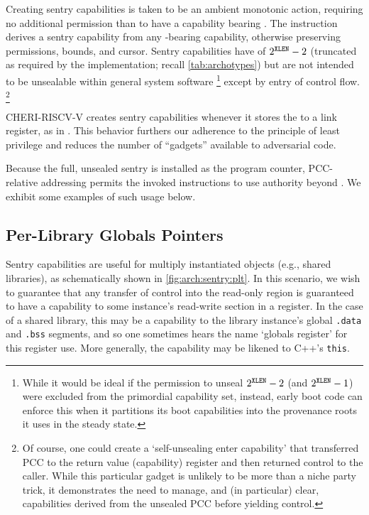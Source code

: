 Creating sentry capabilities is taken to be an ambient monotonic action,
requiring no additional permission than to have a capability bearing
\cappermX.
%
The  instruction derives a sentry capability from any
\cappermX-bearing capability, otherwise preserving permissions, bounds,
and cursor.
%
Sentry capabilities have \cotype{} of $2^{{\texttt{XLEN}}{}}-2$ (truncated as required by the
implementation; recall \cref{tab:archotypes}) but are not intended to be
unsealable within general system software%
%
\footnote{While it would be ideal if the permission to unseal \cotype{}
$2^{{\texttt{XLEN}}{}}-2$ (and $2^{{\texttt{XLEN}}{}}-1$) were excluded from the primordial capability set,
instead, early boot code can enforce this when it partitions its boot
capabilities into the provenance roots it uses in the steady state.}
%
except by entry of control flow.%
%
\footnote{Of course, one could create a `self-unsealing enter capability' that
transferred PCC to the return value (capability) register and then returned
control to the caller.  While this particular gadget is unlikely to be more
than a niche party trick, it demonstrates the need to manage, and (in
particular) clear, capabilities derived from the unsealed PCC before yielding
control.}

CHERI-RISCV-V creates sentry capabilities
whenever it stores the \PCC{} to a link register, as in .
This behavior furthers our adherence
to the principle of least privilege and reduces the number of ``gadgets''
available to adversarial code.

Because the full, unsealed sentry is installed as the program counter,
PCC-relative addressing permits the invoked instructions to use authority
beyond \cappermX.  We exhibit some examples of such usage below.


\subsection{Per-Library Globals Pointers}

Sentry capabilities are useful for multiply instantiated objects (e.g., shared
libraries), as schematically shown in \cref{fig:arch:sentry:plt}.  In this
scenario, we wish to guarantee that any transfer of control into the read-only
region is guaranteed to have a capability to some instance's read-write section
in a register.  In the case of a shared library, this may be a capability to
the library instance's global \texttt{.data} and \texttt{.bss} segments, and so
one sometimes hears the name `globals register' for this register use.  More
generally, the capability may be likened to C++'s \texttt{this}.

